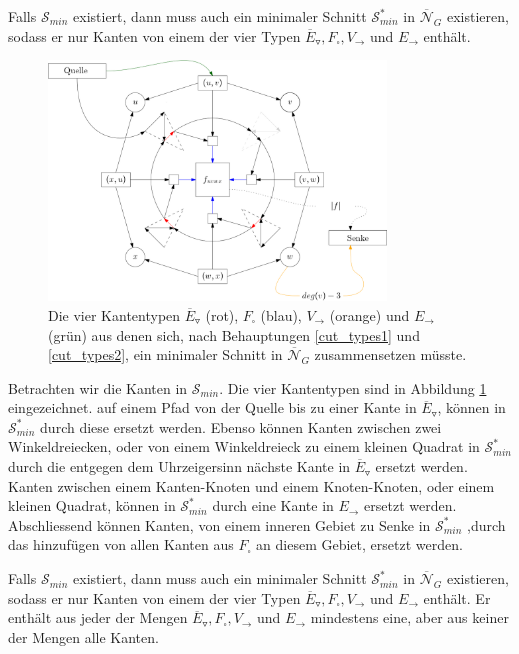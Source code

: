 \begin{claim} \label{cut_types1}
Falls $\mathcal{S}_{min}$ existiert, dann muss auch ein minimaler Schnitt $\mathcal{S}_{min}^*$ in $\overline{\mathcal{N}}_G$ existieren, sodass er nur Kanten von einem der vier Typen $\overline{E}_\triangledown, F_\square, V_\to$ und $E_\to$ enthält.
\end{claim}

\begin{figure}
	\centering
  	\includegraphics[width=0.8\textwidth]{face_cut.png}
  	\caption{Die vier Kantentypen $\overline{E}_\triangledown$ (rot), $F_\square$ (blau), $V_\to$ (orange) und $E_\to$ (grün) aus denen sich, nach Behauptungen \ref{cut_types1} und \ref{cut_types2}, ein minimaler Schnitt in $\overline{\mathcal{N}}_G$ zusammensetzen müsste.}
	\label{cut_edges}
\end{figure}

Betrachten wir die Kanten in $\mathcal{S}_{min}$. Die vier Kantentypen sind in Abbildung \ref{cut_edges} eingezeichnet. auf einem Pfad von der Quelle bis zu einer Kante in $\overline{E}_\triangledown$, können in $\mathcal{S}_{min}^*$ durch diese ersetzt werden. Ebenso können Kanten zwischen zwei Winkeldreiecken, oder von einem Winkeldreieck zu einem kleinen Quadrat in $\mathcal{S}_{min}^*$ durch die entgegen dem Uhrzeigersinn nächste Kante in $\overline{E}_\triangledown$ ersetzt werden. Kanten zwischen einem Kanten-Knoten und einem Knoten-Knoten, oder einem kleinen Quadrat, können in $\mathcal{S}_{min}^*$ durch eine Kante in $E_\to$ ersetzt werden. Abschliessend können Kanten, von einem inneren Gebiet zu Senke in $\mathcal{S}_{min}^*$ ,durch das hinzufügen von allen Kanten aus $F_\square$ an diesem Gebiet, ersetzt werden.

\begin{claim}\label{cut_types2}
Falls $\mathcal{S}_{min}$ existiert, dann muss auch ein minimaler Schnitt $\mathcal{S}_{min}^*$ in $\overline{\mathcal{N}}_G$ existieren, sodass er nur Kanten von einem der vier Typen $\overline{E}_\triangledown, F_\square, V_\to$ und $E_\to$ enthält. Er enthält aus jeder der Mengen $\overline{E}_\triangledown, F_\square, V_\to$ und $E_\to$ mindestens eine, aber aus keiner der Mengen alle Kanten.
\end{claim}

